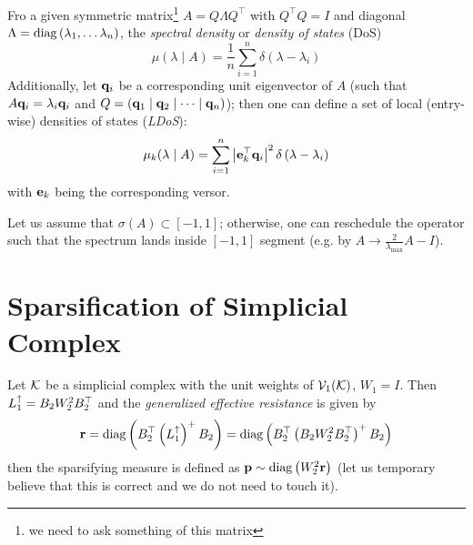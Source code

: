 \documentclass{mynotes}
\begin{document}
\begin{definition}
      Fro a given symmetric matrix\footnote{we need to ask something of this matrix} \( A = Q \Lambda Q^\top \) with \( Q^\top Q = I \) and diagonal \( \Lambda = \operatorname{diag} \left( \lambda_1, \dots \lambda_{n} \right) \), the \emph{spectral density} or \emph{density of states} (DoS)
      \begin{equation}
            \mu( \lambda \mid A ) = \frac{1}{n} \sum_{i=1}^{n} \delta \left( \lambda - \lambda_i \right)
      \end{equation}
      Additionally, let \( \mathbf{q}_i \) be a corresponding unit eigenvector of \( A \) (such that \( A \mathbf{q}_i = \lambda_i \mathbf{q}_i \) and \( Q = \left( \mathbf{q}_1 \mid \mathbf{q}_2 \mid \dots \mid \mathbf{q}_n \right)\)); then one can define a set of local (entry-wise) densities of states (\emph{LDoS}):
      \begin{equation}
            \mu_k ( \lambda \mid A ) = \sum_{i=1}^{n} \left| \mathbf{e}_k^\top \mathbf{q}_i \right|^2 \delta \left( \lambda - \lambda_i \right)
      \end{equation}
      with \( \mathbf{e}_k \) being the corresponding versor. 
\end{definition}

Let us assume that \( \sigma \left(  A  \right) \subset [-1, 1] \); otherwise, one can reschedule the operator such that the spectrum lands inside \( [-1, 1]\) segment (e.g. by \( A \to \frac{2}{\lambda_{\max}} A - I \)).



\chapter{Sparsification of Simplicial Complex}

Let \( \mathcal{K} \) be a simplicial complex with the unit weights of \( \mathcal{V}_{1}(\mathcal{K}) \), \( W_1 = I \). Then \( L_{1}^{\uparrow} = B_2 W_2^2 B_2^\top \) and the \emph{generalized effective resistance} is given by 
\begin{equation}
      \mathbf{r} = \operatorname{diag} \left( B_2^\top \left( L_{1}^{\uparrow} \right)^+ B_2 \right) = \operatorname{diag} \left( B_2^\top \left( B_2 W_2^2 B_2^\top \right)^+ B_2 \right)
\end{equation}
then the sparsifying measure is defined as \( \mathbf{p} \sim \operatorname{diag} \left( W_2^2 \mathbf{r}  \right)\) (let us temporary believe that this is correct and we do not need to touch it).
\end{document}
